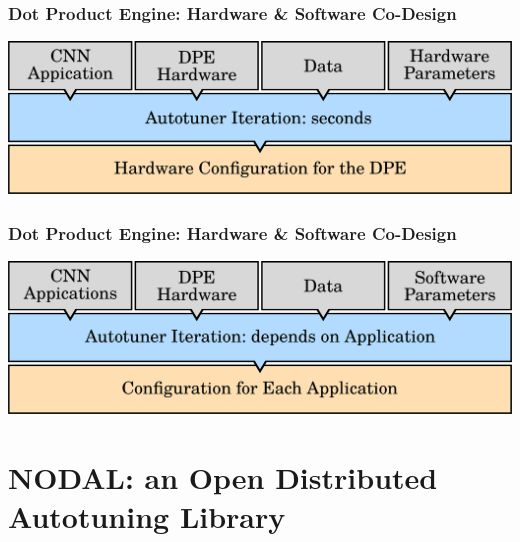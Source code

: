 \documentclass[10pt, compress, aspectratio=169]{beamer}
\begin{document}
\begin{frame}
    \frametitle{Dot Product Engine: Hardware \& Software Co-Design}
    \begin{center}
        \includegraphics[width=.9\textwidth]{overview_dpe_hard}
    \end{center}
\end{frame}

\begin{frame}
    \frametitle{Dot Product Engine: Hardware \& Software Co-Design}
    \begin{center}
        \includegraphics[width=.9\textwidth]{overview_dpe_app}
    \end{center}
\end{frame}

\section{NODAL: an Open Distributed Autotuning Library}
\end{document}
